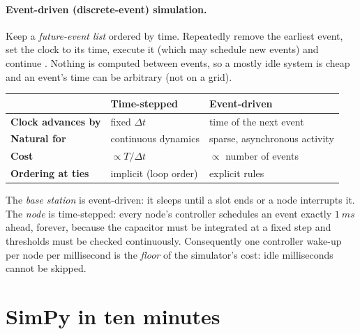 \paragraph{Event-driven (discrete-event) simulation.}
Keep a \emph{future-event list} ordered by time. Repeatedly remove the earliest event, set the clock to its time, execute
it (which may schedule new events) and continue \citep{banks2010,law2015}. Nothing is computed between events, so a mostly idle system is cheap and an event's time can be arbitrary (not on a grid).

\begin{center}
\small
\renewcommand{\arraystretch}{1.15}
\begin{tabularx}{\linewidth}{@{}>{\sffamily\bfseries}p{3.0cm}XX@{}}
\toprule
 & Time-stepped & Event-driven\\
\midrule
Clock advances by & fixed $\Delta t$ & time of the next event\\
Natural for & continuous dynamics & sparse, asynchronous activity\\
Cost & $\propto T/\Delta t$ & $\propto$ number of events\\
Ordering at ties & implicit (loop order) & explicit rules\\
\bottomrule
\end{tabularx}
\end{center}

\begin{keyidea}
The \emph{base station} is event-driven: it sleeps until a slot ends or a node interrupts it. The \emph{node} is
time-stepped: every node's controller schedules an event exactly $\SI{1}{ms}$ ahead, forever, because the capacitor must be integrated at a fixed step and thresholds must be checked
continuously. Consequently one controller wake-up per node per millisecond is the \emph{floor} of the simulator's cost: idle milliseconds cannot be skipped.
\end{keyidea}

\section{SimPy in ten minutes}
\label{sec:simpy}

